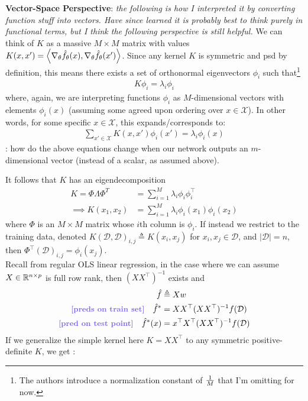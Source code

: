 \documentclass[11pt]{article}
\begin{document}
\textbf{Vector-Space Perspective}: \textit{the following is how I interpreted it by converting function stuff into vectors. Have since learned it is probably best to think purely in functional terms, but I think the following perspective is still helpful.} We can think of $K$ as a massive $M \times M$ matrix with values $K(x, x') = \left\langle \nabla_{\theta} \hat f_{\theta}(x)  ,  \nabla_{\theta} \hat f_{\theta}(x') \right\rangle$. Since any kernel $K$ is symmetric and psd by definition, this means there exists a set of orthonormal eigenvectors $\phi_i$ such that\footnote{The authors introduce a normalization constant of $\frac{1}{M}$ that I'm omitting for now.}
\begin{align}
	K\phi_i = \lambda_i \phi_i 
\end{align}
where, again, we are interpreting functions $\phi_i$ as $M$-dimensional vectors with elements $\phi_i(x)$ (assuming some agreed upon ordering over $x \in \mathcal X$). In other words, for some specific $x \in \mathcal X$, this expands/corresponds to:
\begin{align}
	\sum_{x' \in \mathcal X} K(x, x') \phi_i(x') = \lambda_i \phi_i(x)
\end{align}
: how do the above equations change when our network outputs an $m$-dimensional vector (instead of a scalar, as assumed above). 

It follows that $K$ has an eigendecomposition 
\begin{align}
	K 
		= \Phi \Lambda \Phi^T 
		&= \sum_{i = 1}^M \lambda_i \phi_i \phi_i^\top \\
	\implies K(x_1, x_2) 
		&= \sum_{i = 1}^M \lambda_i \phi_i(x_1) \phi_i(x_2)
\end{align}
where $\Phi$ is an $M \times M$ matrix whose $i$th column is $\phi_i$. If instead we restrict to the training data, denoted $K(\mathcal D, \mathcal D)_{i,j} \triangleq K(x_i, x_j)$ for $x_i, x_j \in \mathcal D$, and $|\mathcal D| = n$, then $\Phi^\top(\mathcal D)_{i,j} = \phi_i(x_j)$. \\

Recall from regular OLS linear regression, in the case where we can assume $X \in \mathbb{R}^{n \times p}$ is full row rank, then $(XX^\top)^{-1}$ exists and
\begin{align}
	\hat f &\triangleq X w \\
	\mtblue{[preds on train set]} \quad 
		\hat f^* &= XX^\top (XX^\top)^{-1} f(\mathcal D) \\
	\mtblue{[pred on test point]} \quad 
		\hat f^*(x) &= x^\top X^\top (XX^\top)^{-1} f(\mathcal D) 
\end{align}
If we generalize the simple kernel here $K = XX^\top$ to any symmetric positive-definite $K$, we get :
\end{document}
